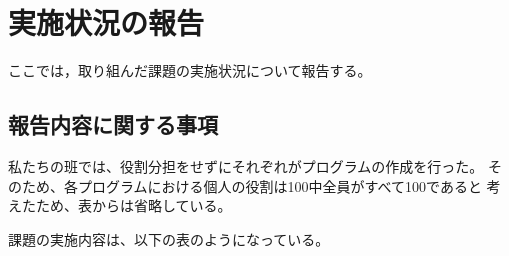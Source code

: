 \documentclass{jarticle}[11pt]
\begin{document}

\section{実施状況の報告}
\label{sec:実施状況の報告}

ここでは，取り組んだ課題の実施状況について報告する。

\subsection{報告内容に関する事項}
私たちの班では、役割分担をせずにそれぞれがプログラムの作成を行った。
そのため、各プログラムにおける個人の役割は100中全員がすべて100であると
考えたため、表からは省略している。

課題の実施内容は、以下の表のようになっている。
\end{document}
